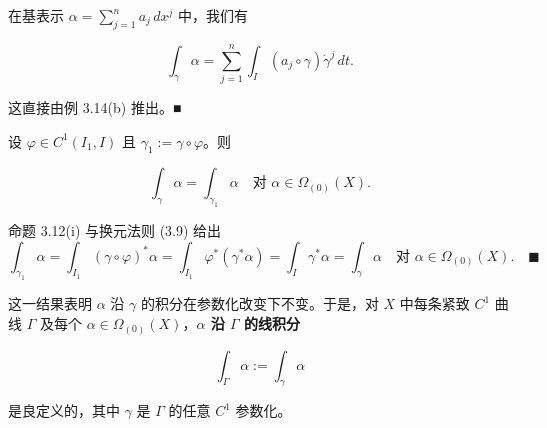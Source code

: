\begin{remark}

\begin{items}
\item

在基表示 $ \alpha=\sum_{j=1}^{n}a_j\,dx^{j} $ 中，我们有

\[
\int_{\gamma}\alpha=\sum_{j=1}^{n}\int_I(a_j\circ\gamma)\dot{\gamma}^{j}\,dt .
\]

\proofhead
这直接由例 3.14(b) 推出。\nobreak\hspace{0.35em}■
\item

设 $ \varphi \in C^1(I_1, I) $ 且 $ \gamma_1 := \gamma\circ\varphi $。则

\[
\int_{\gamma}\alpha=\int_{\gamma_1}\alpha\quad\text{对 }\alpha\in\Omega_{(0)}(X) .
\]

\proofhead
命题 3.12(i) 与换元法则 (3.9) 给出
\[
\int_{\gamma_1}\alpha=\int_{I_1}(\gamma\circ\varphi)^{*}\alpha=\int_{I_1}\varphi^{*}(\gamma^{*}\alpha)=\int_I\gamma^{*}\alpha=\int_{\gamma}\alpha\quad\text{对 }\alpha\in\Omega_{(0)}(X) .\quad\blacksquare
\]

这一结果表明 $ \alpha $ 沿 $ \gamma $ 的积分在参数化改变下不变。于是，对 $ X $ 中每条紧致 $ C^1 $ 曲线 $ \Gamma $ 及每个 $ \alpha \in \Omega_{(0)}(X) $，\textbf{$ \alpha $ 沿 $ \Gamma $ 的线积分}

\[
\int_{\Gamma}\alpha:=\int_{\gamma}\alpha
\]

是良定义的，其中 $ \gamma $ 是 $ \Gamma $ 的任意 $ C^1 $ 参数化。

\end{items}

\end{remark}

